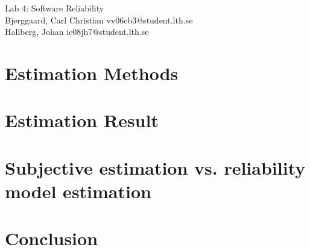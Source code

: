 \documentclass[titlepage]{article}
\begin{document}
\begin{center}
	\huge{Lab 4: Software Reliability } \\
	\small{Bjerggaard, Carl Christian vv06cb3@student.lth.se \\Hallberg, Johan ic08jh7@student.lth.se}

\vspace*{1cm}

\end{center}

\thispagestyle{empty}

\clearpage
\section{Estimation Methods}
\label{methods}


\section{Estimation Result}
\label{results}


\section{Subjective estimation vs. reliability model estimation}
\label{subvsmodel}


\section{Conclusion}
\label{conclusion}

\end{document}
